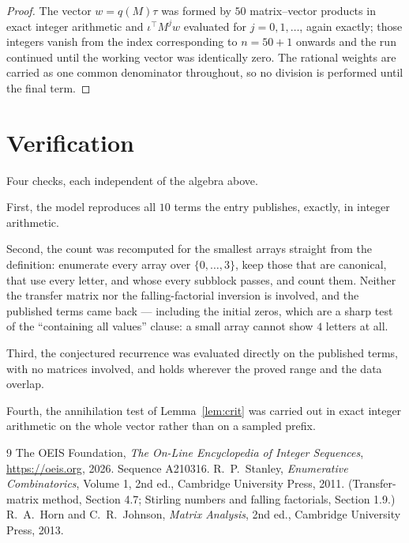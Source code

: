 \documentclass[11pt,a4paper]{article}
\theoremstyle{plain}
\theoremstyle{definition}
\begin{document}
\begin{proof}
The vector $w=q(M)\tau$ was formed by $50$ matrix--vector products in exact integer
arithmetic and $\iota^{\!\top}M^{j}w$ evaluated for $j=0,1,\dots$, again exactly; those
integers vanish from the index corresponding to $n=50+1$ onwards and the run continued
until the working vector was identically zero. The rational weights are carried as one common
denominator throughout, so no division is performed until the final term.
\end{proof}

\section{Verification}

Four checks, each independent of the algebra above.

First, the model reproduces all $10$ terms the entry publishes, exactly, in integer
arithmetic.

Second, the count was recomputed for the smallest arrays straight from the definition:
enumerate every array over $\{0,\dots,3\}$, keep those that are canonical, that use every
letter, and whose every subblock passes, and count them. Neither the transfer matrix nor the
falling-factorial inversion is involved, and the published terms came back --- including the
initial zeros, which are a sharp test of the ``containing all values'' clause: a small array
cannot show $4$ letters at all.

Third, the conjectured recurrence was evaluated directly on the published terms, with no
matrices involved, and holds wherever the proved range and the data overlap.

Fourth, the annihilation test of Lemma~\ref{lem:crit} was carried out in exact integer
arithmetic on the whole vector rather than on a sampled prefix.

\begin{thebibliography}{9}
 The OEIS Foundation, \emph{The On-Line Encyclopedia of Integer
Sequences}, \url{https://oeis.org}, 2026. Sequence A210316.
 R.~P.~Stanley, \emph{Enumerative Combinatorics}, Volume 1, 2nd ed.,
Cambridge University Press, 2011. (Transfer-matrix method, Section 4.7; Stirling numbers and
falling factorials, Section 1.9.)
 R.~A.~Horn and C.~R.~Johnson, \emph{Matrix Analysis}, 2nd ed., Cambridge
University Press, 2013.
\end{thebibliography}
\end{document}

